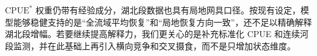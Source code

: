 $\mathrm{CPUE}^*$ 权重仍带有经验成分，湖北段数据也具有局地网具口径。按现有设定，模型能够稳健支持的是“全流域平均恢复”和“局地恢复方向一致”，还不足以精确解释湖北段增幅。若要继续提高解释力，我们更关心的是补充标准化 CPUE 和连续河段监测，并在此基础上再引入横向竞争和交叉摄食，而不是只增加状态维度。
